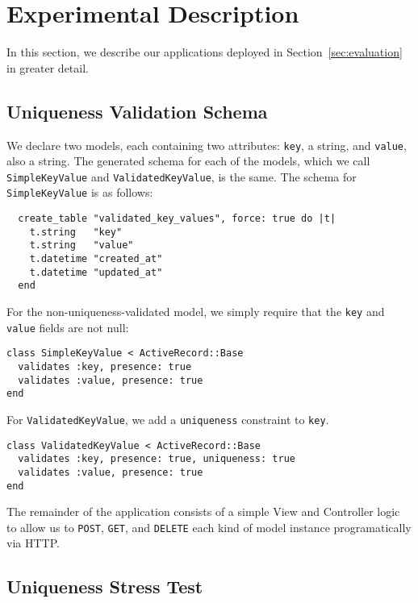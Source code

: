 \section{Experimental Description}
\label{sec:appendix-experiments}

\lstset{language=Ruby,basicstyle=\ttfamily,columns=fullflexible,frame=single}

In this section, we describe our applications deployed in Section~\ref{sec:evaluation} in greater detail.

\subsection{Uniqueness Validation Schema}
\label{sec:appendix-uniqueness-schema}

We declare two models, each containing two attributes: \texttt{key}, a string, and \texttt{value}, also a string. The generated schema for each of the models, which we call \texttt{SimpleKeyValue} and \texttt{ValidatedKeyValue}, is the same. The schema for \texttt{SimpleKeyValue} is as follows:

\begin{lstlisting}
  create_table "validated_key_values", force: true do |t|
    t.string   "key"
    t.string   "value"
    t.datetime "created_at"
    t.datetime "updated_at"
  end
\end{lstlisting}

For the non-uniqueness-validated model, we simply require that the \texttt{key} and \texttt{value} fields are not null:

\begin{lstlisting}
class SimpleKeyValue < ActiveRecord::Base
  validates :key, presence: true
  validates :value, presence: true
end
\end{lstlisting}

For \texttt{ValidatedKeyValue}, we add a \texttt{uniqueness} constraint to \texttt{key}.

\begin{lstlisting}
class ValidatedKeyValue < ActiveRecord::Base
  validates :key, presence: true, uniqueness: true
  validates :value, presence: true
end
\end{lstlisting}

The remainder of the application consists of a simple View and Controller logic to allow us to \texttt{POST}, \texttt{GET}, and \texttt{DELETE} each kind of model instance programatically via HTTP.


\subsection{Uniqueness Stress Test}
\label{sec:appendix-uniqueness-stress}

